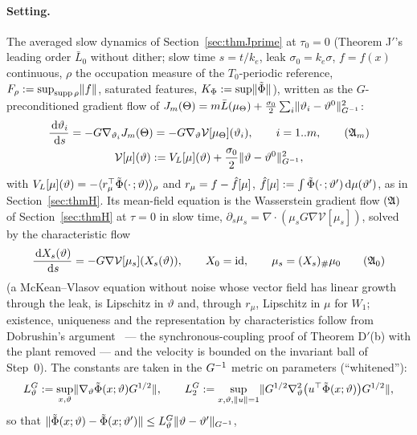 \paragraph{Setting.} The averaged slow dynamics of Section~\ref{sec:thmJprime} at $\tau_0 = 0$ (Theorem J$'$'s
leading order $\bar L_0$ without dither; slow time $s = t/k_e$, leak $\sigma_0 = k_e\sigma$, $f = f(x)$ continuous,
$\rho$ the occupation measure of the $T_0$-periodic reference, $F_\rho := \sup_{\operatorname{supp}\rho}\lVert f\rVert$, saturated
features, $K_\Phi := \sup\lVert \tilde\Phi\rVert$), written as the $G$-preconditioned gradient flow of
$J_m(\Theta) = m\bar L(\mu_\Theta) + \frac{\sigma_0}2\sum_i\lVert \vartheta_i - \vartheta^0\rVert^2_{G^{-1}}$:
\begin{gather}
  \frac{\dd\vartheta_i}{\dd s} = -G\nabla_{\vartheta_i}J_m(\Theta) = -G\nabla_\vartheta\mathcal{V}[\mu_\Theta](\vartheta_i),\qquad
  i = 1..m,
  \tag{$\mathfrak{A}_m$}\\
  \mathcal{V}[\mu](\vartheta) := V_L[\mu](\vartheta) + \frac{\sigma_0}2\norm{\vartheta - \vartheta^0}^2_{\Ginv},\notag
\end{gather}
with $V_L[\mu](\vartheta) = -\langle r_\mu^\top\tilde\Phi(\cdot\,;\vartheta)\rangle_\rho$ and $r_\mu = f - \hat f[\mu]$,
$\hat f[\mu] := \int\tilde\Phi(\cdot\,;\vartheta')\,\mathrm{d}\mu(\vartheta')$, as in Section~\ref{sec:thmH}. Its mean-field
equation is the Wasserstein gradient flow $(\mathfrak{A})$ of Section~\ref{sec:thmH} at $\tau = 0$ in slow time,
$\partial_s\mu_s = \nabla\cdot(\mu_sG\nabla\mathcal{V}[\mu_s])$, solved by the characteristic flow
\begin{equation}
  \frac{\dd X_s(\vartheta)}{\dd s} = -G\nabla\mathcal{V}[\mu_s](X_s(\vartheta)),\qquad X_0 = \mathrm{id},\qquad
  \mu_s = (X_s)_\#\mu_0
  \tag{$\mathfrak{A}_0$}
\end{equation}
(a McKean--Vlasov equation without noise whose vector field has linear growth through the leak, is Lipschitz in
$\vartheta$ and, through $r_\mu$, Lipschitz in $\mu$ for $W_1$; existence, uniqueness and the representation by
characteristics follow from Dobrushin's argument~\cite{S35} --- the synchronous-coupling proof of Theorem D$'$(b)
with the plant removed --- and the velocity is bounded on the invariant ball of Step~0). The constants are taken in
the $G^{-1}$ metric on parameters (``whitened''):
\[
  L_\vartheta^G := \sup_{x,\vartheta}\lVert \nabla_\vartheta\tilde\Phi(x;\vartheta)G^{1/2}\rVert,\qquad
  L_2^G := \sup_{x,\vartheta,\lVert u\rVert=1}\lVert G^{1/2}\nabla^2_\vartheta\bigl(u^\top\tilde\Phi(x;\vartheta)\bigr)G^{1/2}\rVert,
\]
so that $\lVert \tilde\Phi(x;\vartheta) - \tilde\Phi(x;\vartheta')\rVert\le L_\vartheta^G\lVert \vartheta - \vartheta'\rVert_{G^{-1}}$,
